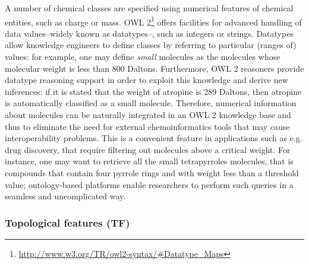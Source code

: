 \documentclass[10pt]{bmc_article}
\newenvironment{bmcformat}{\baselineskip20pt\sloppy\setboolean{publ}{false}}{\baselineskip20pt\sloppy}
\begin{document}
\begin{bmcformat}
A number of chemical classes are specified using numerical features of chemical entities, such as charge or mass. OWL 2\footnote{\url{http://www.w3.org/TR/owl2-syntax/#Datatype_Maps}} offers facilities for advanced handling of data values--widely known as datatypes--, such as integers or strings. Datatypes allow knowledge engineers to define classes by referring to particular (ranges of) values: for example, one may define \emph{small} molecules as the molecules whose molecular weight is less than 800 Daltons. Furthermore, OWL 2 reasoners provide datatype reasoning support\cite{Motik2008} in order to exploit this knowledge and derive new inferences: if it is stated that the weight of atropine is 289 Daltons, then atropine is automatically classified as a small molecule. Therefore, numerical information about molecules can be naturally integrated in an OWL 2 knowledge base and thus to eliminate the need for external chemoinformatics tools that may cause interoperability problems. This is a convenient feature in applications such as e.g. drug discovery, that require filtering out molecules above a critical weight. For instance, one may want to retrieve all the small tetrapyrroles molecules, that is compounds that contain four pyrrole rings and with weight less than a threshold value; ontology-based platforms enable researchers to perform such queries in a seamless and uncomplicated way.

\subsubsection*{Topological features (TF)}
\label{subsubsec:cycles}


\end{bmcformat}
\end{document}
